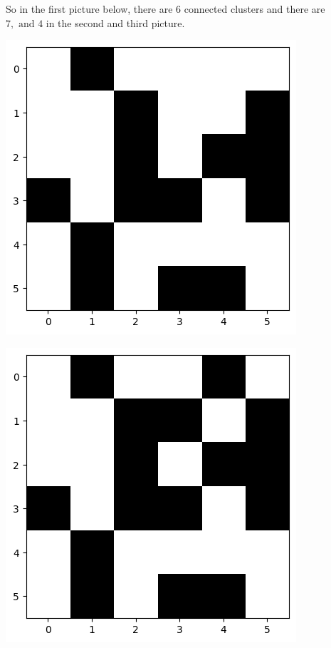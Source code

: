 \documentclass[compress]{beamer}
\begin{document}
\begin{frame}
    So in the first picture below, there are \(6\) connected clusters and there are
    \(7, \text{ and } 4\) in the second and third picture.

    \vspace{12pt}

    \begin{minipage}{.3\linewidth}
        \includegraphics[width=\linewidth]{p1.png}
    \end{minipage}\hfill%
    \begin{minipage}{.3\linewidth}
        \includegraphics[width=\linewidth]{p2.png}

\end{minipage}
\end{frame}
\end{document}
